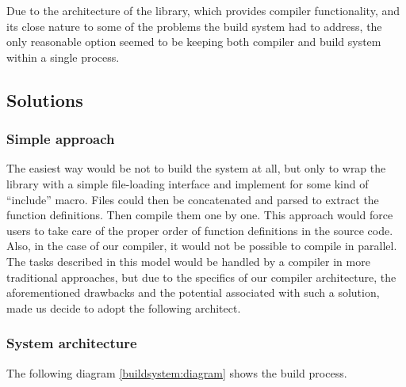Due to the architecture of the library, which provides compiler
functionality, and its close nature to some of the problems the build
system had to address, the only reasonable option seemed to be keeping
both compiler and build system within a single process.

\hypertarget{solutions}{%
\subsection{Solutions}\label{Solutions}}

\hypertarget{simple-approach}{%
\subsubsection{Simple approach}\label{simple-approach}}
The easiest way would be not to build the system at all,
but only to wrap the library with a simple file-loading interface and
implement for some kind of ``include'' macro. Files could then be
concatenated and parsed
to extract the function definitions. Then compile them one by one. This
approach would force users to take care of the proper order of function definitions
in the source code. Also, in the case of our compiler, it would not be possible to
compile in parallel. The tasks described in this model would
be handled by a compiler in more traditional approaches, but due
to the specifics of our compiler architecture, the aforementioned drawbacks
and the potential associated with such a solution, made us decide to adopt
the following architect. 


\hypertarget{system-architecture}{%
\subsubsection{System architecture}\label{system-architecture}}

The following diagram \ref{buildsystem:diagram} shows the build process.


